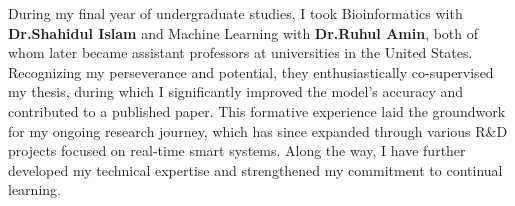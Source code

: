 During my final year of undergraduate studies, I took Bioinformatics with \textbf{Dr.Shahidul Islam}
and Machine Learning with \textbf{Dr.Ruhul Amin}, both of whom later became assistant professors
at universities in the United States.
Recognizing my perseverance and potential, they enthusiastically co-supervised my thesis, during which I significantly
improved the model’s accuracy and contributed to a published paper.
This formative experience laid the groundwork for my ongoing research journey, which has since expanded through various R\&D projects
focused on real-time smart systems.
Along the way, I have further developed my technical expertise and strengthened my commitment to continual learning.
